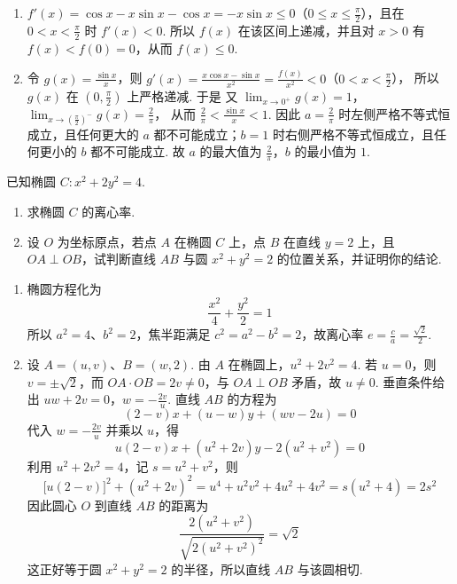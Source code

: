 \begin{solution}
\begin{enumerate}
\item \(f'(x)=\cos x-x\sin x-\cos x=-x\sin x\leqslant0\)（\(0\leqslant x\leqslant\frac\pi2\)），且在 \(0<x<\frac\pi2\) 时 \(f'(x)<0\). 所以 \(f(x)\) 在该区间上递减，并且对 \(x>0\) 有 \(f(x)<f(0)=0\)，从而 \(f(x)\leqslant0\).
\item 令 \(g(x)=\frac{\sin x}{x}\)，则 \(g'(x)=\frac{x\cos x-\sin x}{x^{2}}=\frac{f(x)}{x^{2}}<0\)（\(0<x<\frac\pi2\)），
所以 \(g(x)\) 在 \(\left(0,\frac\pi2\right)\) 上严格递减. 于是
又 \(\displaystyle\lim_{x\to0^+}g(x)=1\)，\(\displaystyle\lim_{x\to(\frac{\pi}{2})^-}g(x)=\frac2\pi\)，
从而 \(\frac2\pi<\frac{\sin x}{x}<1\). 因此 \(a=\frac2\pi\) 时左侧严格不等式恒成立，且任何更大的 \(a\) 都不可能成立；\(b=1\) 时右侧严格不等式恒成立，且任何更小的 \(b\) 都不可能成立. 故 \(a\) 的最大值为 \(\frac2\pi\)，\(b\) 的最小值为 \(1\).
\end{enumerate}
\end{solution}

\begin{problem}
已知椭圆 \(C: x^{2} + 2y^{2} = 4\).

\begin{enumerate}
\item 求椭圆 \(C\) 的离心率.
\item 设 \(O\) 为坐标原点，若点 \(A\) 在椭圆 \(C\) 上，点 \(B\) 在直线 \(y = 2\) 上，且 \(OA \perp OB\)，试判断直线 \(AB\) 与圆 \(x^{2} + y^{2} = 2\) 的位置关系，并证明你的结论.
\end{enumerate}
\end{problem}

\begin{solution}
\begin{enumerate}
\item 椭圆方程化为
\[
\frac{x^{2}}4+\frac{y^{2}}2=1
\]
所以 \(a^{2}=4\)、\(b^{2}=2\)，焦半距满足 \(c^{2}=a^{2}-b^{2}=2\)，故离心率
\(e=\frac ca=\frac{\sqrt2}{2}\).
\item 设 \(A=(u,v)\)、\(B=(w,2)\). 由 \(A\) 在椭圆上，\(u^{2}+2v^{2}=4\). 若 \(u=0\)，则 \(v=\pm\sqrt2\)，而 \(OA\cdot OB=2v\ne0\)，与 \(OA\perp OB\) 矛盾，故 \(u\ne0\). 垂直条件给出
\(uw+2v=0\)，\(w=-\frac{2v}{u}\).
直线 \(AB\) 的方程为
\[
(2-v)x+(u-w)y+(wv-2u)=0
\]
代入 \(w=-\frac{2v}{u}\) 并乘以 \(u\)，得
\[
u(2-v)x+(u^{2}+2v)y-2(u^{2}+v^{2})=0
\]
利用 \(u^{2}+2v^{2}=4\)，记 \(s=u^{2}+v^{2}\)，则
\[
\bigl[u(2-v)\bigr]^{2}+(u^{2}+2v)^{2}
=u^{4}+u^{2}v^{2}+4u^{2}+4v^{2}
=s(u^{2}+4)=2s^{2}
\]
因此圆心 \(O\) 到直线 \(AB\) 的距离为
\[
\frac{2(u^{2}+v^{2})}
{\sqrt{2(u^{2}+v^{2})^{2}}}
=\sqrt2
\]
这正好等于圆 \(x^{2}+y^{2}=2\) 的半径，所以直线 \(AB\) 与该圆相切.
\end{enumerate}
\end{solution}

